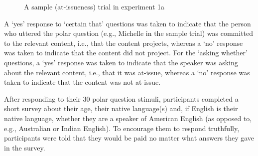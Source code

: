 \documentclass[11pt,fleqn]{article}
\newcommand{\6}{\mbox{$[\hspace*{-.6mm}[$}}
\newcommand{\9}{\mbox{$]\hspace*{-.6mm}]$}}
\begin{document}
\begin{figure}[!h]
\begin{center}
\end{center}
\caption{A sample (at-issueness) trial in experiment 1a}\label{f-trial-exp1}
\end{figure}

A `yes' response to `certain that' questions was taken to indicate that the person who uttered the polar question (e.g., Michelle in the sample trial) was committed to the relevant content, i.e., that the content projects, whereas a `no' response was taken to indicate that the content did not project. For the `asking whether' questions, a `yes'  response was taken to indicate that the speaker was asking about the relevant content, i.e., that it was at-issue, whereas a `no' response was taken to indicate that the content was not at-issue. 

After responding to their 30 polar question stimuli, participants completed a short survey about their age, their native language(s) and, if English is their native language, whether they are a speaker of American English (as opposed to, e.g., Australian or Indian English). To encourage them to respond truthfully, participants were told that they would be paid no matter what answers they gave in the survey.
\end{document}
